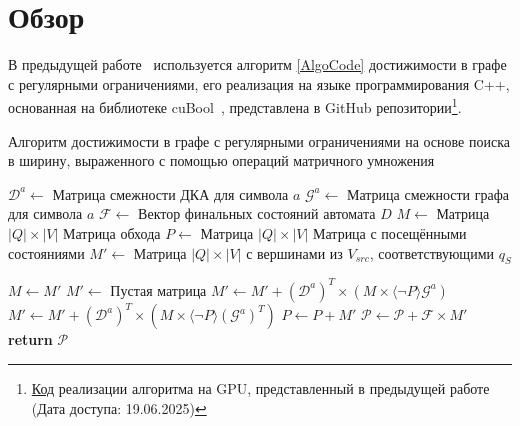 
\section{Обзор}
\label{sec:relatedworks}

В предыдущей работе~\cite{PrevWork} используется алгоритм \ref{AlgoCode} достижимости в графе с регулярными ограничениями, его реализация на языке программирования \textsc{C++}, основанная на библиотеке cuBool~\cite{CuBool}, представлена в GitHub репозитории\footnote{\href{https://github.com/mitya-y/rpq/tree/cb2583e64e51f28dfe16f8e2b66732bc44bb04d5}{Код} реализации алгоритма на GPU, представленный в предыдущей работе (Дата доступа: 19.06.2025)}.

\begin{algorithm}[H]
    \caption{Алгоритм достижимости в графе с регулярными ограничениями на основе поиска в ширину, выраженного с помощью операций матричного умножения}
    \label{AlgoCode}
    \begin{algorithmic}[1]
            \State $\mathcal{D}^a\gets $ Матрица смежности ДКА для символа $a$
            \State $\mathcal{G}^a\gets $ Матрица смежности графа для символа $a$
            \State $\mathcal{F}\gets $ Вектор финальных состояний автомата $D$
            \State $M\gets$ Матрица $|Q| \times |V|$ \Comment Матрица обхода
            \State $P\gets$ Матрица $|Q| \times |V|$ \Comment Матрица с посещёнными состояниями
            \State $M'\gets$ Матрица $|Q| \times |V|$ с вершинами из $V_{src}$, соответствующими $q_S$

                \State $M\gets M'$
                \State $M'\gets$ Пустая матрица
                        \State $M'\gets M' + (\mathcal{D}^a)^T \times (M \times \langle \neg P \rangle \mathcal{G}^a)$ 
                    \Else
                        \State $M'\gets M' + (\mathcal{D}^a)^T \times (M \times \langle \neg P \rangle (\mathcal{G}^a)^T)$
                    \EndIf
                \EndFor
                \State $P\gets P + M'$ 
                \State $\mathcal{P}\gets \mathcal{P} + \mathcal{F} \times M'$ 
            \EndWhile
            \State \textbf{return} $\mathcal{P}$
        \EndProcedure
    \end{algorithmic}
    \label{final-algo}
\end{algorithm}

